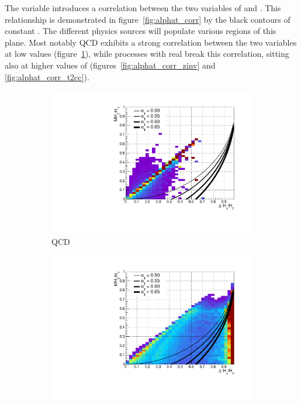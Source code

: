 The \alphat variable introduces a correlation between the two variables of \mht
and \deltaHT. This relationship is demonstrated in figure~\ref{fig:alphat_corr}
by the black contours of constant \alphat. The different physics sources
will populate various regions of this plane. Most notably QCD exhibits a strong
correlation between the two variables at low \alphat values
(figure~\ref{fig:alphat_corr_qcd}), while processes with real \met break this
correlation, sitting also at higher values of \alphat
(figures~\ref{fig:alphat_corr_zinv} and \ref{fig:alphat_corr_t2cc}).

\begin{figure}[h!]
  \centering
  \begin{subfigure}[b]{.46\textwidth}
    \includegraphics[width=\textwidth]{Figs/alphat/alphat_correlation_QCD.pdf}
    \caption{QCD}
    \label{fig:alphat_corr_qcd}
  \end{subfigure}
  \begin{subfigure}[b]{.46\textwidth}
    \includegraphics[width=\textwidth]{Figs/alphat/alphat_correlation_Zinv.pdf}

\end{subfigure}
\end{figure}
